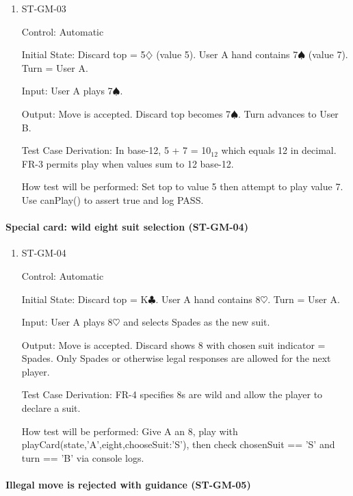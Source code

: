 \documentclass[12pt, titlepage]{article}
\begin{document}
\begin{enumerate}
\item{ST-GM-03\\}

Control: Automatic
					
Initial State: Discard top = 5$\diamondsuit$ (value 5). User A hand contains 7$\spadesuit$ (value 7). Turn = User A.
					
Input: User A plays 7$\spadesuit$.
					
Output: Move is accepted. Discard top becomes 7$\spadesuit$. Turn advances to User B.

Test Case Derivation: In base-12, 5 + 7 = 10$_{12}$ which equals 12 in decimal. FR-3 permits play when values sum to 12 base-12.

How test will be performed: Set top to value 5 then attempt to play value 7. Use canPlay() to assert true and log PASS.
\end{enumerate}

\paragraph{Special card: wild eight suit selection (ST-GM-04)}

\begin{enumerate}
\item{ST-GM-04\\}

Control: Automatic
					
Initial State: Discard top = K$\clubsuit$. User A hand contains 8$\heartsuit$. Turn = User A.
					
Input: User A plays 8$\heartsuit$ and selects Spades as the new suit.
					
Output: Move is accepted. Discard shows 8 with chosen suit indicator = Spades. Only Spades or otherwise legal responses are allowed for the next player.

Test Case Derivation: FR-4 specifies 8s are wild and allow the player to declare a suit.

How test will be performed: Give A an 8, play with playCard(state,'A',eight,{chooseSuit:'S'}), then check chosenSuit == 'S' and turn == 'B' via console logs.
\end{enumerate}

\paragraph{Illegal move is rejected with guidance (ST-GM-05)}
\end{document}
